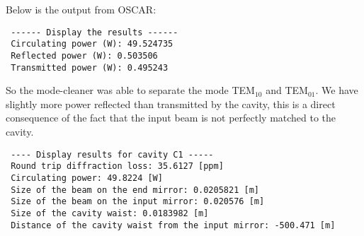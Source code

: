 Below is the output from OSCAR:

\begin{verbatim}
 ------ Display the results ------
 Circulating power (W): 49.524735
 Reflected power (W): 0.503506
 Transmitted power (W): 0.495243
\end{verbatim}

So the mode-cleaner was able to separate the mode TEM$_{10}$ and TEM$_{01}$. We have slightly more power reflected than transmitted by the cavity, this is a direct consequence of the fact that the input beam is not perfectly matched to the cavity.

\begin{verbatim}
 ---- Display results for cavity C1 -----
 Round trip diffraction loss: 35.6127 [ppm]
 Circulating power: 49.8224 [W]
 Size of the beam on the end mirror: 0.0205821 [m]
 Size of the beam on the input mirror: 0.020576 [m]
 Size of the cavity waist: 0.0183982 [m]
 Distance of the cavity waist from the input mirror: -500.471 [m]
\end{verbatim}


